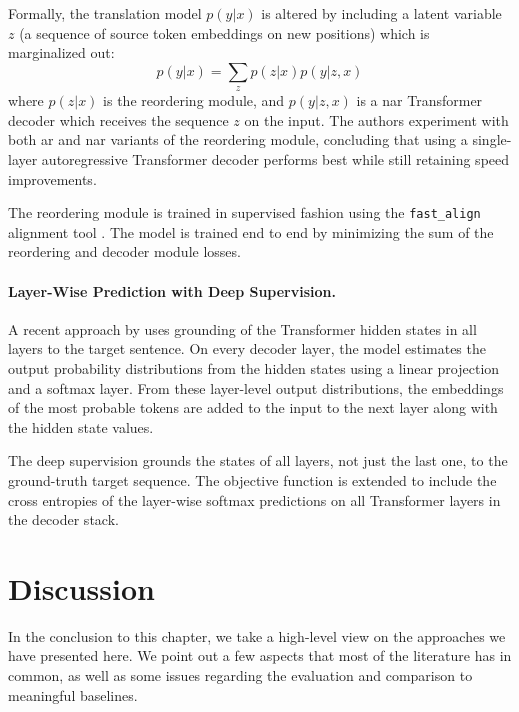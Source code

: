 Formally, the translation model $p(y|x)$ is altered by including a latent
variable $z$ (a sequence of source token embeddings on new positions) which is
marginalized out:
%
\begin{equation}
  p(y|x) = \sum_{z} p(z|x) p(y|z,x)
\end{equation}
%
where $p(z|x)$ is the reordering module, and $p(y|z,x)$ is a \ac{nar}
Transformer decoder which receives the sequence $z$ on the input. The authors
experiment with both \ac{ar} and \ac{nar} variants of the reordering module,
concluding that using a single-layer autoregressive Transformer decoder
performs best while still retaining speed improvements.

The reordering module is trained in supervised fashion using the
\texttt{fast\_align} alignment tool \citep{dyer-etal-2013-simple}. The model is
trained end to end by minimizing the sum of the reordering and decoder module
losses.

\paragraph{Layer-Wise Prediction with Deep Supervision.}  %
A recent approach by \citet{huang-etal-2021-nonautoregressive} uses grounding
of the Transformer hidden states in all layers to the target sentence. On every
decoder layer, the model estimates the output probability distributions from
the hidden states using a linear projection and a softmax layer. From these
layer-level output distributions, the embeddings of the most probable tokens
are added to the input to the next layer along with the hidden state values.

The deep supervision grounds the states of all layers, not just the last one,
to the ground-truth target sequence. The objective function is extended to
include the cross entropies of the layer-wise softmax predictions on all
Transformer layers in the decoder stack.


\section{Discussion}%
\label{sec:nat:discussion}

In the conclusion to this chapter, we take a high-level view on the approaches
we have presented here. We point out a few aspects that most of the literature
has in common, as well as some issues regarding the evaluation and comparison
to meaningful baselines.

